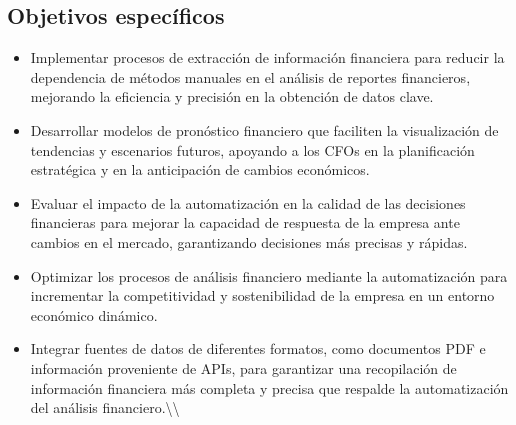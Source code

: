 \documentclass[12pt,letterpaper,oneside]{report}
\renewcommand{\_}{\UnderscoreOriginal\allowbreak}
\begin{document}
\subsection{Objetivos específicos}
\begin{itemize}
\item Implementar procesos de extracción de información financiera para reducir la dependencia de métodos manuales en el análisis de reportes financieros, mejorando la eficiencia y precisión en la obtención de datos clave.
\end{itemize}
\begin{itemize}
\item Desarrollar modelos de pronóstico financiero que faciliten la visualización de tendencias y escenarios futuros, apoyando a los CFOs en la planificación estratégica y en la anticipación de cambios económicos.
\end{itemize}
\begin{itemize}
\item Evaluar el impacto de la automatización en la calidad de las decisiones financieras para mejorar la capacidad de respuesta de la empresa ante cambios en el mercado, garantizando decisiones más precisas y rápidas.
\end{itemize}
\begin{itemize}
\item Optimizar los procesos de análisis financiero mediante la automatización para incrementar la competitividad y sostenibilidad de la empresa en un entorno económico dinámico.
\end{itemize}
\begin{itemize}
\item Integrar fuentes de datos de diferentes formatos, como documentos PDF e información proveniente de APIs, para garantizar una recopilación de información financiera más completa y precisa que respalde la automatización del análisis financiero.\textbackslash{}\textbackslash{}
\end{itemize}
\end{document}
